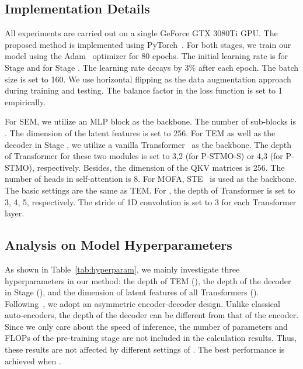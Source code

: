 \documentclass[]{llncs}
\newcommand{\RNum}[1]{\uppercase\expandafter{\romannumeral #1\relax}}
\begin{document}
\subsection{Implementation Details}
All experiments are carried out on a single GeForce GTX 3080Ti GPU. The proposed method is implemented using PyTorch~\cite{paszke2019pytorch}. For both stages, we train our model using the Adam~\cite{kingma2014adam} optimizer for 80 epochs. The initial learning rate is  for Stage \RNum{1} and  for Stage \RNum{2}. The learning rate decays by 3\% after each epoch. The batch size is set to 160. We use horizontal flipping as the data augmentation approach during training and testing. The balance factor  in the loss function is set to 1 empirically.

For SEM, we utilize an MLP block as the backbone. The number of sub-blocks is . The dimension of the latent features is set to 256. For TEM as well as the decoder in Stage \RNum{1}, we utilize a vanilla Transformer~\cite{vaswani2017attention} as the backbone. The depth of Transformer for these two modules is set to 3,2 (for P-STMO-S) or 4,3 (for P-STMO), respectively. Besides, the dimension of the QKV matrices is 256. The number of heads in self-attention is 8. For MOFA, STE~\cite{li2022exploiting} is used as the backbone. The basic settings are the same as TEM. For , the depth of Transformer is set to 3, 4, 5, respectively. The stride of 1D convolution is set to 3 for each Transformer layer. 

\subsection{Analysis on Model Hyperparameters}
As shown in Table~\ref{tab:hyperparam}, we mainly investigate three hyperparameters in our method: the depth of TEM (), the depth of the decoder in Stage \RNum{1} (), and the dimension of latent features of all Transformers (). Following~\cite{he2022masked}, we adopt an asymmetric encoder-decoder design.  Unlike classical auto-encoders, the depth of the decoder can be different from that of the encoder. Since we only care about the speed of inference, the number of parameters and FLOPs of the pre-training stage are not included in the calculation results. Thus, these results are not affected by different settings of . The best performance is achieved when .
\end{document}
